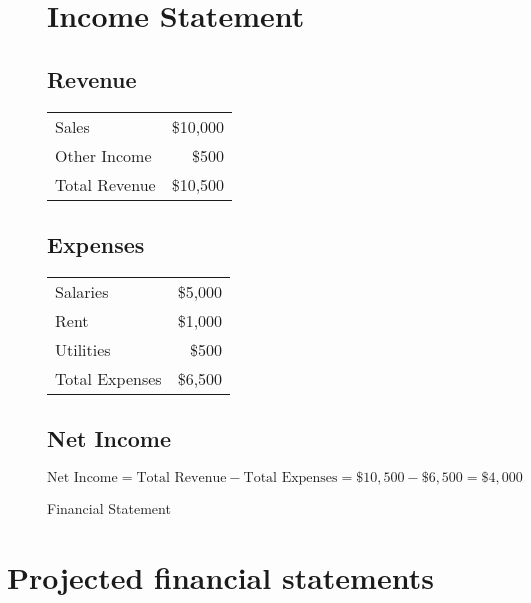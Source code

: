 \begin{figure}[h]
  \centering
  \caption{Financial Statement}
  \label{fig:financial_statement}
  
  \section*{Income Statement}
  
  \subsection*{Revenue}
  \begin{tabular}{lr}
    Sales & \$10,000 \\
    Other Income & \$500 \\
    \midrule
    Total Revenue & \$10,500 \\
  \end{tabular}
  
  \subsection*{Expenses}
  \begin{tabular}{lr}
    Salaries & \$5,000 \\
    Rent & \$1,000 \\
    Utilities & \$500 \\
    \midrule
    Total Expenses & \$6,500 \\
  \end{tabular}
  
  \subsection*{Net Income}
  \[
  \text{Net Income} = \text{Total Revenue} - \text{Total Expenses} = \$10,500 - \$6,500 = \$4,000
  \]
\end{figure}


\section{Projected financial statements}

